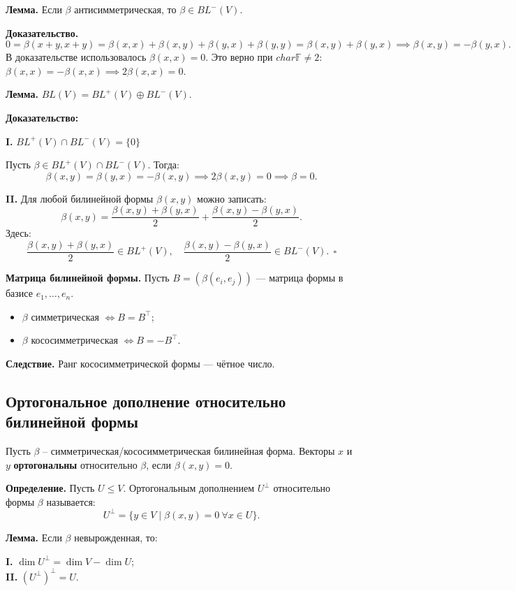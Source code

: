\documentclass[12pt]{article}
\begin{document}
\textbf{Лемма.} Если $\beta$ антисимметрическая, то $\beta \in BL^-(V)$.

\textbf{Доказательство.}
$0 = \beta(x + y, x + y)
  = \beta(x, x) + \beta(x, y) + \beta(y, x) + \beta(y, y) = \beta(x, y) + \beta(y, x)
  \implies \beta(x, y) = -\beta(y, x).$ \\
В доказательстве использовалось $\beta(x,x)=0$. Это верно при $char \mathbb{F} \ne 2$: $\beta(x,x)=-\beta(x,x) \implies 2\beta(x,x)=0$.


\textbf{Лемма.} $BL(V) = BL^+(V) \oplus BL^-(V)$.

\textbf{Доказательство:}

\textbf{I.} $BL^+(V) \cap BL^-(V) = \{0\}$

Пусть $\beta \in BL^+(V) \cap BL^-(V)$. Тогда:
\[
\beta(x, y) = \beta(y, x) = -\beta(x, y) \implies 2\beta(x, y) = 0 \implies \beta = 0.
\]

\textbf{II.} Для любой билинейной формы $\beta(x, y)$ можно записать:
\[
\beta(x, y) = \frac{\beta(x, y) + \beta(y, x)}{2} + \frac{\beta(x, y) - \beta(y, x)}{2}.
\]
Здесь:
\[
\frac{\beta(x, y) + \beta(y, x)}{2} \in BL^+(V), \quad \frac{\beta(x, y) - \beta(y, x)}{2} \in BL^-(V). \ \ \square
\]

\textbf{Матрица билинейной формы.}
Пусть $B = (\beta(e_i, e_j))$ — матрица формы в базисе $e_1, \dots, e_n$.
\begin{itemize}
    \item $\beta$ симметрическая $\iff B = B^\top$;
    \item $\beta$ кососимметрическая $\iff B = -B^\top$.
\end{itemize}

\textbf{Следствие.} Ранг кососимметрической формы — чётное число.

\subsection{Ортогональное дополнение относительно билинейной формы}

Пусть $\beta$ – симметрическая/кососимметрическая билинейная форма. Векторы $x$ и $y$ \textbf{ортогональны} относительно $\beta$, если $\beta(x,y)=0$.

\textbf{Определение.} Пусть $U \leq V$. Ортогональным дополнением $U^\perp$ относительно формы $\beta$ называется:
\[
U^\perp = \{ y \in V \mid \beta(x, y) = 0 \ \forall x \in U \}.
\]

\textbf{Лемма.} Если $\beta$ невырожденная, то:
\begin{itemize}
    \textbf{I.} $\dim U^\perp = \dim V - \dim U$;\\
    \textbf{II.} $(U^\perp)^\perp = U$.
\end{itemize}
\end{document}
